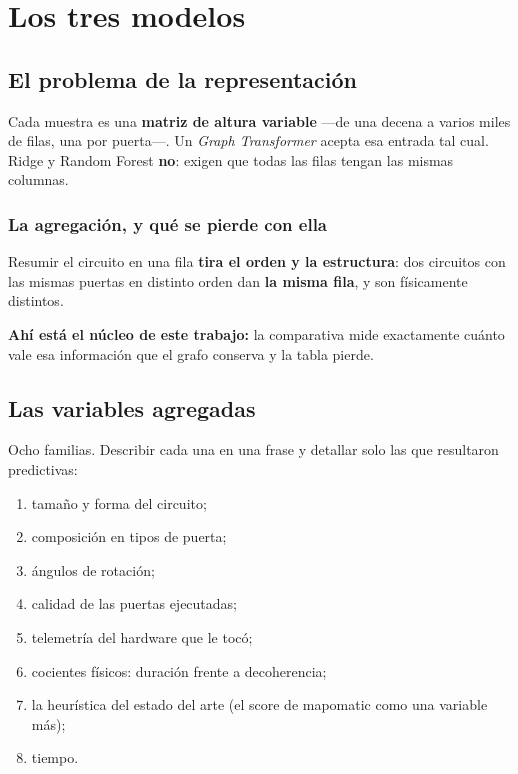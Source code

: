 \chapter{Los tres modelos}
\label{cap:modelos}


\section{El problema de la representación}
\label{sec:representacion_modelos}
Cada muestra es una \textbf{matriz de altura variable} —de una decena a varios miles de filas,
una por puerta—. Un \textit{Graph Transformer} acepta esa entrada tal cual. Ridge y Random
Forest \textbf{no}: exigen que todas las filas tengan las mismas columnas.

\subsection{La agregación, y qué se pierde con ella}
Resumir el circuito en una fila \textbf{tira el orden y la estructura}: dos circuitos con las
mismas puertas en distinto orden dan \textbf{la misma fila}, y son físicamente distintos.

\textbf{Ahí está el núcleo de este trabajo:} la comparativa mide exactamente cuánto vale esa
información que el grafo conserva y la tabla pierde.

\section{Las variables agregadas}
\label{sec:features}
Ocho familias. Describir cada una en una frase y detallar solo las que resultaron predictivas:
\begin{enumerate}
    \item tamaño y forma del circuito;
    \item composición en tipos de puerta;
    \item ángulos de rotación;
    \item calidad de las puertas ejecutadas;
    \item telemetría del hardware que le tocó;
    \item cocientes físicos: duración frente a decoherencia;
    \item la heurística del estado del arte (el score de mapomatic como una variable más);
    \item tiempo.
\end{enumerate}

